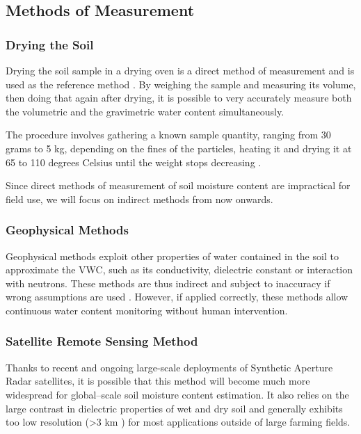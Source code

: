 \subsection{Methods of Measurement}
\subsubsection{Drying the Soil}
Drying the soil sample in a drying oven is a direct method of measurement and is used as the reference method \cite{webster_humidity_1998}. By weighing the sample and measuring its volume, then doing that again after drying, it is possible to very accurately measure both the volumetric and the gravimetric water content simultaneously.

The procedure involves gathering a known sample quantity, ranging from 30 grams to 5 kg, depending on the fines of the particles, heating it and drying it at 65 to 110 degrees Celsius until the weight stops decreasing \cite{department_of_sustainable_natural_resources_soil_2024,myjove_corporation_determination_2024, paul_soil_2007}.

Since direct methods of measurement of soil moisture content are impractical for field use, we will focus on indirect methods from now onwards.

\subsubsection{Geophysical Methods}
Geophysical methods exploit other properties of water contained in the soil to approximate the VWC, such as its conductivity, dielectric constant or interaction with neutrons. These methods are thus indirect and subject to inaccuracy if wrong assumptions are used \cite{webster_humidity_1998}. However, if applied correctly, these methods allow continuous water content monitoring without human intervention.

\subsubsection{Satellite Remote Sensing Method}
Thanks to recent and ongoing large-scale deployments of Synthetic Aperture Radar satellites, it is possible that this method will become much more widespread for global--scale soil moisture content estimation. It also relies on the large contrast in dielectric properties of wet and dry soil and generally exhibits too low resolution (>3 km \cite{podest_applications_nodate,eos_data_analytics_remote_2022}) for most applications outside of large farming fields.

